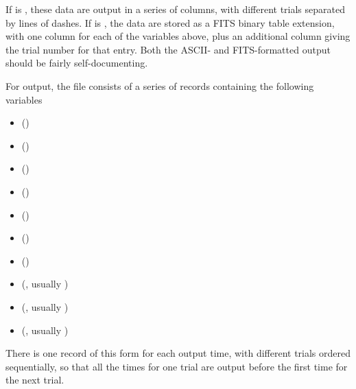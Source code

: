 \documentclass[letterpaper,10pt,english]{sphinxmanual}
\begin{document}
If  is , these data are output in a series of columns, with different trials separated by lines of dashes. If  is , the data are stored as a FITS binary table extension, with one column for each of the variables above, plus an additional column giving the trial number for that entry. Both the ASCII- and FITS-formatted output should be fairly self-documenting.

For  output, the file consists of a series of records containing the following variables
\begin{itemize}
\item {} 
 ()

\item {} 
 ()

\item {} 
 ()

\item {} 
 ()

\item {} 
 ()

\item {} 
 ()

\item {} 
 ()

\item {} 
 (, usually )

\item {} 
 (, usually )

\item {} 
 (, usually )

\end{itemize}

There is one record of this form for each output time, with different trials ordered sequentially, so that all the times for one trial are output before the first time for the next trial.
\end{document}
